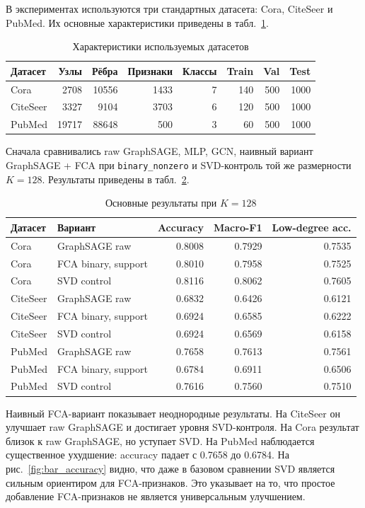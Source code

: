 \documentclass[14pt,a4paper]{extarticle}
\begin{document}
В экспериментах используются три стандартных датасета: Cora, CiteSeer и PubMed.
Их основные характеристики приведены в табл.~\ref{tab:datasets}.

\begin{table}[H]
\centering
\caption{Характеристики используемых датасетов}
\label{tab:datasets}
\begin{tabular}{lrrrrrrr}
\toprule
Датасет & Узлы & Рёбра & Признаки & Классы & Train & Val & Test \\
\midrule
Cora & 2708 & 10556 & 1433 & 7 & 140 & 500 & 1000 \\
CiteSeer & 3327 & 9104 & 3703 & 6 & 120 & 500 & 1000 \\
PubMed & 19717 & 88648 & 500 & 3 & 60 & 500 & 1000 \\
\bottomrule
\end{tabular}
\end{table}

Сначала сравнивались raw GraphSAGE, MLP, GCN, наивный вариант
GraphSAGE + FCA при \texttt{binary\_nonzero} и SVD-контроль той же размерности
$K=128$. Результаты приведены в табл.~\ref{tab:main_results}.

\begin{table}[H]
\centering
\caption{Основные результаты при $K=128$}
\label{tab:main_results}
\begin{tabular}{llrrr}
\toprule
Датасет & Вариант & Accuracy & Macro-F1 & Low-degree acc. \\
\midrule
Cora & GraphSAGE raw & 0.8008 & 0.7929 & 0.7535 \\
Cora & FCA binary, support & 0.8010 & 0.7958 & 0.7525 \\
Cora & SVD control & 0.8116 & 0.8062 & 0.7605 \\
\midrule
CiteSeer & GraphSAGE raw & 0.6832 & 0.6426 & 0.6121 \\
CiteSeer & FCA binary, support & 0.6924 & 0.6585 & 0.6222 \\
CiteSeer & SVD control & 0.6924 & 0.6569 & 0.6158 \\
\midrule
PubMed & GraphSAGE raw & 0.7658 & 0.7613 & 0.7561 \\
PubMed & FCA binary, support & 0.6784 & 0.6911 & 0.6506 \\
PubMed & SVD control & 0.7616 & 0.7560 & 0.7510 \\
\bottomrule
\end{tabular}
\end{table}

Наивный FCA-вариант показывает неоднородные результаты. На CiteSeer он улучшает
raw GraphSAGE и достигает уровня SVD-контроля. На Cora результат близок к raw
GraphSAGE, но уступает SVD. На PubMed наблюдается существенное ухудшение:
accuracy падает с 0.7658 до 0.6784. На рис.~\ref{fig:bar_accuracy} видно, что
даже в базовом сравнении SVD является сильным ориентиром для FCA-признаков. Это
указывает на то, что простое добавление FCA-признаков не является универсальным
улучшением.
\end{document}
